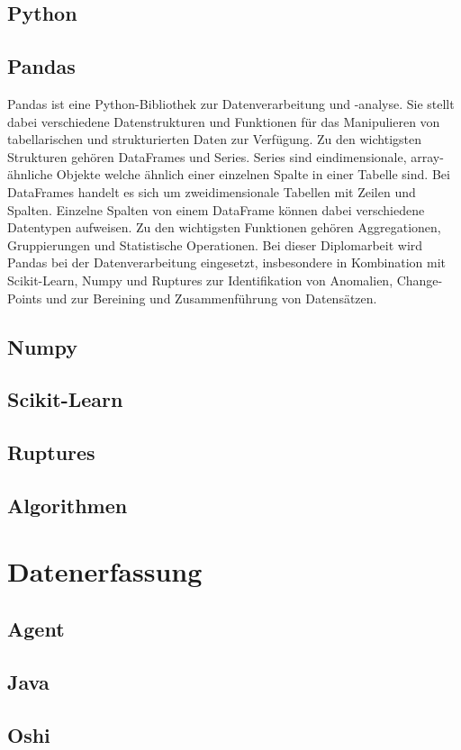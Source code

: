 \documentclass[pdftex,11pt,a4paper]{book}
\begin{document}
\subsection{Python}
\subsection{Pandas}
Pandas ist eine Python-Bibliothek zur Datenverarbeitung und -analyse. Sie stellt dabei verschiedene Datenstrukturen und Funktionen für das Manipulieren von tabellarischen und strukturierten Daten zur Verfügung. Zu den wichtigsten Strukturen gehören DataFrames und Series.  Series sind eindimensionale, array-ähnliche Objekte welche ähnlich einer einzelnen Spalte in einer Tabelle sind. Bei DataFrames handelt es sich um zweidimensionale Tabellen mit Zeilen und Spalten. Einzelne Spalten von einem DataFrame können dabei verschiedene Datentypen aufweisen. Zu den wichtigsten Funktionen gehören Aggregationen, Gruppierungen und Statistische Operationen. Bei dieser Diplomarbeit wird Pandas bei der Datenverarbeitung eingesetzt, insbesondere in Kombination mit Scikit-Learn, Numpy und Ruptures zur Identifikation von Anomalien, Change-Points und zur Bereining und Zusammenführung von Datensätzen.
\subsection{Numpy}
\subsection{Scikit-Learn}
\subsection{Ruptures}
\subsection{Algorithmen}
\section{Datenerfassung}
\subsection{Agent}
\subsection{Java}
\subsection{Oshi}
\end{document}

